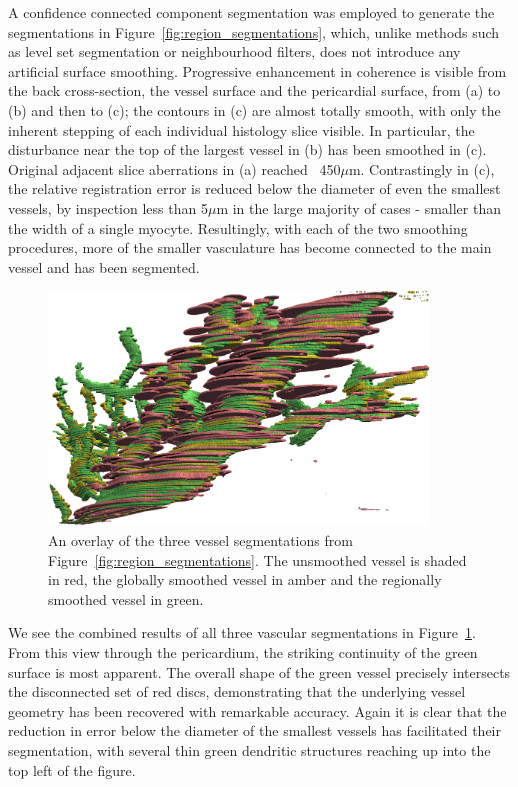      A confidence connected component segmentation was employed to generate the segmentations in Figure~\ref{fig:region_segmentations}, which, unlike methods such as level set segmentation or neighbourhood filters, does not introduce any artificial surface smoothing. Progressive enhancement in coherence is visible from the back cross-section, the vessel surface and the pericardial surface, from (a) to (b) and then to (c); the contours in (c) are almost totally smooth, with only the inherent stepping of each individual histology slice visible. In particular, the disturbance near the top of the largest vessel in (b) has been smoothed in (c). Original adjacent slice aberrations in (a) reached ~450$\mu$m. Contrastingly in (c), the relative registration error is reduced below the diameter of even the smallest vessels, by inspection less than 5$\mu$m in the large majority of cases - smaller than the width of a single myocyte. Resultingly, with each of the two smoothing procedures, more of the smaller vasculature has become connected to the main vessel and has been segmented.
    
    \begin{figure}
      \centering
      \includegraphics[width=0.9\textwidth]{Ch6/Figs/bottom_vessels/vessel_overlay}
      \caption{An overlay of the three vessel segmentations from Figure~\ref{fig:region_segmentations}. The unsmoothed vessel is shaded in red, the globally smoothed vessel in amber and the regionally smoothed vessel in green. }
      \label{fig:vessel_segmentations}
    \end{figure}
    
    We see the combined results of all three vascular segmentations in Figure~\ref{fig:vessel_segmentations}. From this view through the pericardium, the striking continuity of the green surface is most apparent. The overall shape of the green vessel precisely intersects the disconnected set of red discs, demonstrating that the underlying vessel geometry has been recovered with remarkable accuracy. Again it is clear that the reduction in error below the diameter of the smallest vessels has facilitated their segmentation, with several thin green dendritic structures reaching up into the top left of the figure.

